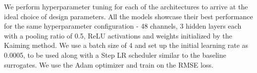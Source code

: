 We perform hyperparameter tuning for each of the architectures to arrive at the ideal choice of design parameters. All the models showcase their best performance for the same hyperparameter configuration - 48 channels, 3 hidden layers each with a pooling ratio of 0.5, ReLU activations and weights initialized by the Kaiming method. We use a batch size of 4 and set up the initial learning rate as 0.0005, to be used along with a Step LR scheduler similar to the baseline surrogates. We use the Adam optimizer and train on the RMSE loss. 


